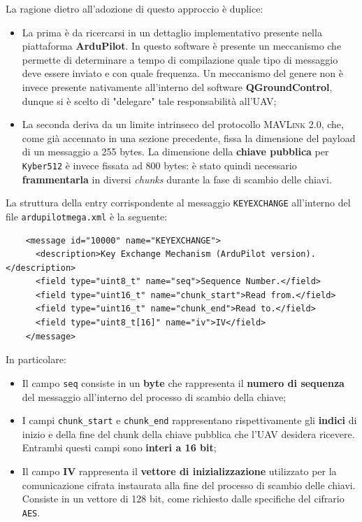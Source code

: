 \documentclass[a4paper, 12pt, oneside]{article}
\theoremstyle{definition}
\begin{document}
La ragione dietro all'adozione di questo approccio è duplice: 

\begin{itemize}
    \item La prima è da ricercarsi in un dettaglio implementativo presente nella piattaforma \textbf{ArduPilot}. In questo software è presente un meccanismo che permette di determinare a tempo di compilazione quale tipo di messaggio deve essere inviato e con quale frequenza. Un meccanismo del genere non è invece presente nativamente all'interno del software \textbf{QGroundControl}, dunque si è scelto di "delegare" tale responsabilità all'UAV;
    \item La seconda deriva da un limite intrinseco del protocollo \textsc{MAVLink} 2.0, che, come già accennato in una sezione precedente, fissa la dimensione del payload di un messaggio a 255 bytes. La dimensione della \textbf{chiave pubblica} per \texttt{Kyber512} è invece fissata ad 800 bytes: è stato quindi necessario \textbf{frammentarla} in diversi \textit{chunks} durante la fase di scambio delle chiavi.
\end{itemize}

La struttura della entry corrispondente al messaggio \texttt{KEYEXCHANGE} all'interno del file \texttt{ardupilotmega.xml} è la seguente:

\begin{verbatim}
    <message id="10000" name="KEYEXCHANGE">
      <description>Key Exchange Mechanism (ArduPilot version).</description>
      <field type="uint8_t" name="seq">Sequence Number.</field>
      <field type="uint16_t" name="chunk_start">Read from.</field>
      <field type="uint16_t" name="chunk_end">Read to.</field>
      <field type="uint8_t[16]" name="iv">IV</field>
    </message>
\end{verbatim}

In particolare:

\begin{itemize}
    \item Il campo \texttt{seq} consiste in un \textbf{byte} che rappresenta il \textbf{numero di sequenza} del messaggio all'interno del processo di scambio della chiave;
    \item I campi \texttt{chunk\_start} e \texttt{chunk\_end} rappresentano rispettivamente gli \textbf{indici} di inizio e della fine del chunk della chiave pubblica che l'UAV desidera ricevere. Entrambi questi campi sono \textbf{interi a 16 bit};
    \item Il campo \textbf{IV} rappresenta il \textbf{vettore di inizializzazione} utilizzato per la comunicazione cifrata instaurata alla fine del processo di scambio delle chiavi. Consiste in un vettore di 128 bit, come richiesto dalle specifiche del cifrario \texttt{AES}.
\end{itemize}
\end{document}

